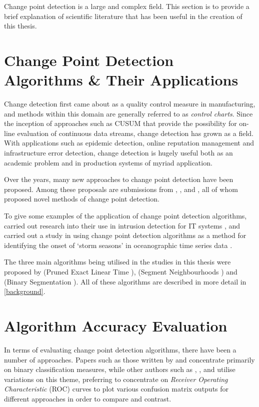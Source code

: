 \documentclass[../main.tex]{subfiles}
\begin{document}
Change point detection is a large and complex field. This section is to provide a brief explanation of scientific literature that has been useful in the creation of this thesis.

\section{Change Point Detection Algorithms \& Their Applications}

Change detection first came about as a quality control measure in manufacturing, and methods within this domain are generally referred to as \emph{control charts}. Since the inception of approaches such as CUSUM \cite{Page1954} that provide the possibility for on-line evaluation of continuous data streams, change detection has grown as a field. With applications such as epidemic detection, online reputation management and infrastructure error detection, change detection is hugely useful both as an academic problem and in production systems of myriad application.

Over the years, many new approaches to change point detection have been proposed. Among these proposals are submissions from \citeauthor{Desobry2005} \cite{Desobry2005}, \citeauthor{Kawahara2009} \cite{Kawahara2009}, and \citeauthor{Downey2008} \cite{Downey2008}, all of whom proposed novel methods of change point detection.

To give some examples of the application of change point detection algorithms, \citeauthor{Tartakovsky2005} carried out research into their use in intrusion detection for IT systems \cite{Tartakovsky2005}, and \citeauthor{Killick2011} carried out a study in using change point detection algorithms as a method for identifying the onset of `storm seasons' in oceanographic time series data \cite{Killick2011}.

The three main algorithms being utilised in the studies in this thesis were proposed by \citeauthor{Killick2011a} (Pruned Exact Linear Time \cite{Killick2011a}), \citeauthor{Auger1989} (Segment Neighbourhoods \cite{Auger1989}) and \citeauthor{Jackson2003} (Binary Segmentation \cite{Jackson2003}). All of these algorithms are described in more detail in \autoref{background}.

\section{Algorithm Accuracy Evaluation}

In terms of evaluating change point detection algorithms, there have been a number of approaches. Papers such as those written by \citeauthor{Buntain2014} \cite{Buntain2014} and \citeauthor{Qahtan2015} \cite{Qahtan2015} concentrate primarily on binary classification measures, while other authors such as \citeauthor{Desobry2005}, \citeauthor{Fawcett1999}, and \citeauthor{Kawahara2009} utilise variations on this theme, preferring to concentrate on \emph{Receiver Operating Characteristic} (ROC) curves to plot various confusion matrix outputs for different approaches in order to compare and contrast.
\end{document}
